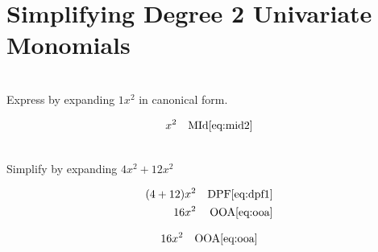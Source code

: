 \documentclass[20150903-160354-rs2.2-MarksMathNotebook.tex]{subfiles}
\begin{document}

\section{Simplifying Degree 2 Univariate Monomials}\label{Simplifying Degree 2 Univariate Monomials}

\begin{example}[id:20141120-202842] \label{20141120-202842} \hfill \\

Express by expanding $1x^2$ in canonical form.

\soln

\solnsteps
\begin{align*}
x^2 && \text{MId} \eqref{eq:mid2}
\end{align*}
\end{example}

\begin{example}[id:20141106-151138] \label{20141106-151138}  \hfill \\

Simplify by expanding $4x^2+12x^2$

\soln

\solnsteps
\begin{align*}
(4+12)x^2 && \text{DPF} \eqref{eq:dpf1} \\
16x^2 && \text{OOA} \eqref{eq:ooa}
\end{align*}

\soln

\lesssteps
\begin{align*}
16x^2 && \text{OOA} \eqref{eq:ooa}
\end{align*}

\end{example}
\end{document}
